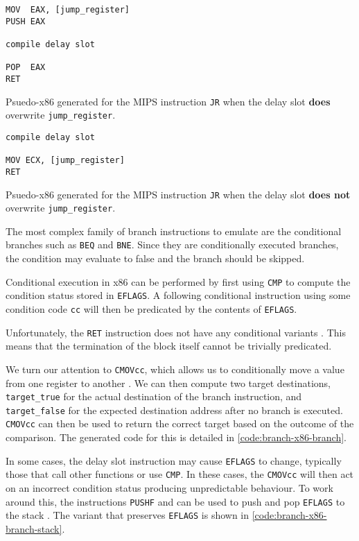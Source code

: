 \begin{lstfloat}[H]
    \begin{lstlisting}
MOV  EAX, [jump_register]
PUSH EAX

compile delay slot

POP  EAX
RET
    \end{lstlisting}
    \caption{Psuedo-x86 generated for the MIPS instruction \texttt{JR} when the delay slot \textbf{does} overwrite \texttt{jump\_register}.}
    \label{code:branch-x86-jr-stack}
\end{lstfloat}

\begin{lstfloat}[H]
    \begin{lstlisting}
compile delay slot

MOV ECX, [jump_register]
RET
    \end{lstlisting}
    \caption{Psuedo-x86 generated for the MIPS instruction \texttt{JR} when the delay slot \textbf{does not} overwrite \texttt{jump\_register}.}
    \label{code:branch-x86-jr}
\end{lstfloat}

The most complex family of branch instructions to emulate are the conditional branches such as \texttt{BEQ} and \texttt{BNE}. Since they are conditionally executed branches, the condition may evaluate to false and the branch should be skipped.

Conditional execution in x86 can be performed by first using \texttt{CMP} \cite{x86-cmp} to compute the condition status stored in \texttt{EFLAGS}. A following conditional instruction using some condition code \texttt{cc} will then be predicated by the contents of \texttt{EFLAGS}.

Unfortunately, the \texttt{RET} instruction does not have any conditional variants \cite{x86-ret}. This means that the termination of the block itself cannot be trivially predicated.

We turn our attention to \texttt{CMOVcc}, which allows us to conditionally move a value from one register to another \cite{x86-cmovcc}. We can then compute two target destinations, \texttt{target\_true} for the actual destination of the branch instruction, and \texttt{target\_false} for the expected destination address after no branch is executed. \texttt{CMOVcc} can then be used to return the correct target based on the outcome of the comparison. The generated code for this is detailed in \autoref{code:branch-x86-branch}.

In some cases, the delay slot instruction may cause \texttt{EFLAGS} to change, typically those that call other functions or use \texttt{CMP}. In these cases, the \texttt{CMOVcc} will then act on an incorrect condition status producing unpredictable behaviour. To work around this, the instructions \texttt{PUSHF} and  can be used to push and pop \texttt{EFLAGS} to the stack \cite{x86-pushf, x86-popf}. The variant that preserves \texttt{EFLAGS} is shown in \autoref{code:branch-x86-branch-stack}.

